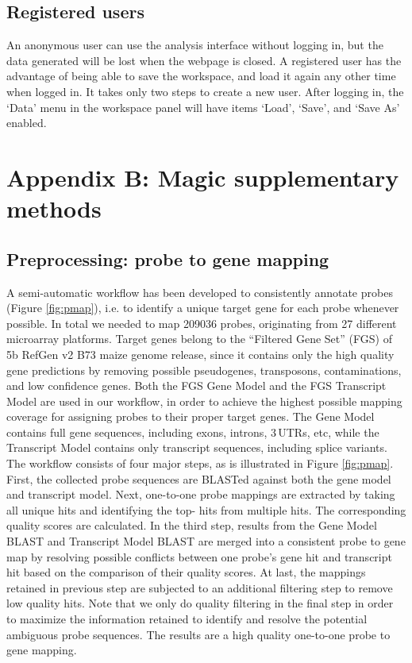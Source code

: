 \subsection{Registered users}\label{apd:colombos-user}

An anonymous user can use the analysis interface without logging in, but the 
data generated will be lost when the webpage is closed. A registered user has 
the advantage of being able to save the workspace, and load it again any other 
time when logged in. It takes only two steps to create a new user. After 
logging in, the `Data' menu in the workspace panel will have items 
`Load', `Save', and `Save As' enabled.




\section{Appendix B: Magic supplementary methods}

\subsection{Preprocessing: probe to gene mapping}

A semi-automatic workflow has been developed to consistently
annotate probes (Figure \ref{fig:pmap}), i.e. to identify a unique target gene
for each probe whenever possible. In total we needed to map
209036 probes, originating from 27 different microarray
platforms. Target genes belong to the “Filtered Gene Set” (FGS)
of 5b RefGen v2 B73 maize genome release, since it contains only
the high quality gene predictions by removing possible
pseudogenes, transposons, contaminations, and low confidence
genes. Both the FGS Gene Model and the FGS Transcript Model are
used in our workflow, in order to achieve the highest possible
mapping coverage for assigning probes to their proper target
genes. The Gene Model contains full gene sequences, including
exons, introns, 3\textquotesingle\,UTRs, etc, while the Transcript Model contains
only transcript sequences, including splice variants. The
workflow consists of four major steps, as is illustrated in
Figure \ref{fig:pmap}. First, the collected probe sequences are BLASTed
against both the gene model and transcript model. Next,
one-to-one probe mappings are extracted by taking all unique hits
and identifying the top- hits from multiple hits. The
corresponding quality scores are calculated. In the third step,
results from the Gene Model BLAST and Transcript Model BLAST are
merged into a consistent probe to gene map by resolving possible
conflicts between one probe’s gene hit and transcript hit based
on the comparison of their quality scores. At last, the mappings
retained in previous step are subjected to an additional
filtering step to remove low quality hits. Note that we only do
quality filtering in the final step in order to maximize the
information retained to identify and resolve the potential
ambiguous probe sequences. The results are a high quality
one-to-one probe to gene mapping.


